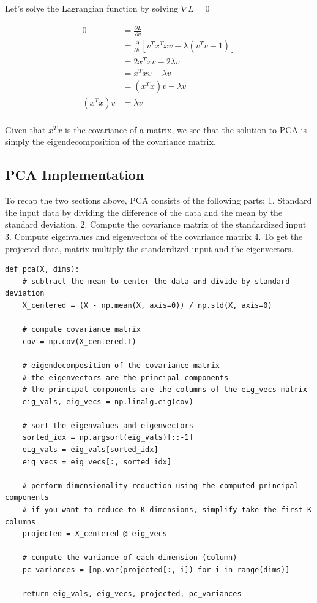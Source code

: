 \documentclass[openany]{book}
\begin{document}
Let's solve the Lagrangian function by solving \(\nabla L = 0\)

\begin{align*}
0 &= \frac{\partial L}{\partial v} \\ 
&= \frac{\partial}{\partial v}[v^Tx^Txv - \lambda (v^Tv - 1)]  \\ 
&= 2x^Txv - 2\lambda v  \\
&= x^Txv - \lambda v  \\
&= (x^Tx)v - \lambda v  \\
(x^Tx)v &= \lambda v  \\
\end{align*}

Given that \(x^Tx\) is the covariance of a matrix, we see that the
solution to PCA is simply the eigendecomposition of the covariance
matrix.

    \subsection{PCA Implementation}\label{pca-implementation}

To recap the two sections above, PCA consists of the following parts: 1.
Standard the input data by dividing the difference of the data and the
mean by the standard deviation. 2. Compute the covariance matrix of the
standardized input 3. Compute eigenvalues and eigenvectors of the
covariance matrix 4. To get the projected data, matrix multiply the
standardized input and the eigenvectors.

\begin{tcolorbox}
\tiny
\begin{verbatim}
def pca(X, dims):
    # subtract the mean to center the data and divide by standard deviation
    X_centered = (X - np.mean(X, axis=0)) / np.std(X, axis=0)

    # compute covariance matrix
    cov = np.cov(X_centered.T)

    # eigendecomposition of the covariance matrix
    # the eigenvectors are the principal components
    # the principal components are the columns of the eig_vecs matrix
    eig_vals, eig_vecs = np.linalg.eig(cov)

    # sort the eigenvalues and eigenvectors
    sorted_idx = np.argsort(eig_vals)[::-1]
    eig_vals = eig_vals[sorted_idx]
    eig_vecs = eig_vecs[:, sorted_idx]

    # perform dimensionality reduction using the computed principal components
    # if you want to reduce to K dimensions, simplify take the first K columns
    projected = X_centered @ eig_vecs

    # compute the variance of each dimension (column)
    pc_variances = [np.var(projected[:, i]) for i in range(dims)]

    return eig_vals, eig_vecs, projected, pc_variances
\end{verbatim}
\end{tcolorbox}
\end{document}

